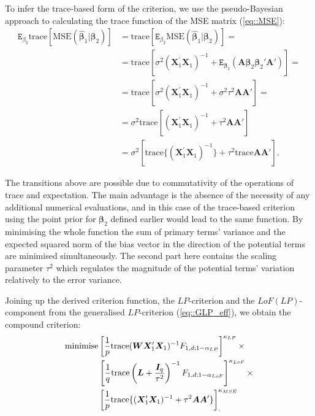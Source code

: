 To infer the trace-based form of the criterion, we use the pseudo-Bayesian approach to calculating the trace function of the MSE matrix (\ref{eq::MSE}): 
\begin{align*}
\mathtt{E}_{\beta_2}\mbox{trace}[\mbox{MSE}(\bm{\hat{\beta}}_1|\bm{\beta}_2)]&=\mbox{trace}[\mathtt{E}_{\beta_2}\mbox{MSE}(\bm{\hat{\beta}}_1|\bm{\beta}_2)]=\\&=\mbox{trace}[\sigma^2(\bm{X}_1^{'}\bm{X}_1)^{-1} + \mathtt{E}_{\bm{\beta}_2}(\bm{A}\bm{\beta}_2\bm{\beta}_2'\bm{A}')]=\\&=\mbox{trace}[\sigma^2(\bm{X}_1^{'}\bm{X}_1)^{-1}+\sigma^2\tau^2\bm{A}\bm{A}']=\\&=\sigma^2\mbox{trace}[(\bm{X}_1^{'}\bm{X}_1)^{-1}+\tau^2\bm{A}\bm{A}']\\&=\sigma^2[\mbox{trace}\{(\bm{X}_1^{'}\bm{X}_1)^{-1}\}+\tau^2\mbox{trace}\bm{A}\bm{A}'].
\end{align*}

The transitions above are possible due to commutativity of the operations of trace and expectation. The main advantage is the absence of the necessity of any additional numerical evaluations, and in this case of the trace-based criterion using the point prior for $\bm{\beta}_2$ defined earlier would lead to the same function. By minimising the whole function the sum of primary terms' variance and the expected squared norm of the bias vector in the direction of the potential terms are minimised simultaneously. The second part here contains the scaling parameter $\tau^2$ which regulates the magnitude of the potential terms' variation relatively to the error variance. 

Joining up the derived criterion function, the $LP$-criterion and the $LoF(LP)$-component from the generalised $LP$-criterion (\ref{eq::GLP_eff}), we obtain the compound criterion:
\begin{align}
\label{eq::MSE_L}
\mbox{minimise} &\left[\frac{1}{p}\mbox{trace}(\bm{WX}'_{1}\bm{X}_{1})^{-1}F_{1,d;1-\alpha_{LP}}\right]^{\kappa_{LP}}\times \notag\\& \left[\frac{1}{q}\mbox{trace}\left(\bm{L}+\frac{\bm{I}_{q}}{\tau^{2}}\right)^{-1}F_{1,d;1-\alpha_{LoF}}\right]^{\kappa_{LoF}}\times 
\notag\\& \left[\frac{1}{p}\mbox{trace}\{(\bm{X}'_{1}\bm{X}_{1})^{-1}+\tau^2\bm{A}\bm{A}'\}\right]^{\kappa_{MSE}}_{.}
\end{align}